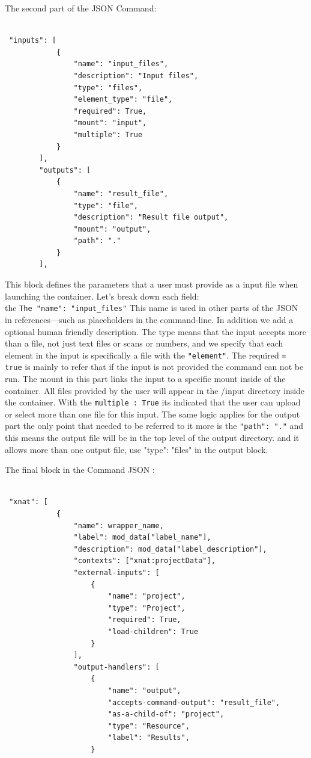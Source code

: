 The second part of the JSON Command:


\begin{lstlisting}

 "inputs": [
            {
                "name": "input_files",
                "description": "Input files",
                "type": "files",
                "element_type": "file",
                "required": True,
                "mount": "input",
                "multiple": True
            }
        ],
        "outputs": [
            {
                "name": "result_file",
                "type": "file",
                "description": "Result file output",
                "mount": "output",
                "path": "."
            }
        ],
\end{lstlisting}


This block defines the parameters that a user must provide as a input file when launching the container. 
Let's break down each field:\\

the \texttt{The "name": "input\_files"}  This name is used in other parts of the JSON in references—such as placeholders in the command-line. In addition we add a optional human friendly description. The type means that the input accepts more than a file, not just text files or scans or numbers, and we specify that each element in the input is specifically a file with  the \texttt{"element"}.
The required \texttt{= true} is mainly to refer that if the input is not provided the command can not be run. The mount in this part links the input to a specific mount inside of the container. All files provided by the user will appear in the /input directory inside the container. With the \texttt{multiple : True} its indicated that the user can upload or select more than one file for this input.
The same logic applies for the output part the only point that needed to be referred to it more is the \texttt{"path": "."} and this means the output file will be in the top level of the \/output directory. and it allows more than one output file, use "type": "files" in the output block.

The final block in the Command JSON :

\begin{lstlisting}

 "xnat": [
            {
                "name": wrapper_name,
                "label": mod_data["label_name"],
                "description": mod_data["label_description"],
                "contexts": ["xnat:projectData"],  
                "external-inputs": [
                    { 
                        "name": "project",
                        "type": "Project",
                        "required": True,
                        "load-children": True
                    }
                ],
                "output-handlers": [
                    {
                        "name": "output",
                        "accepts-command-output": "result_file",
                        "as-a-child-of": "project",
                        "type": "Resource",
                        "label": "Results",
                    }
\end{lstlisting}

